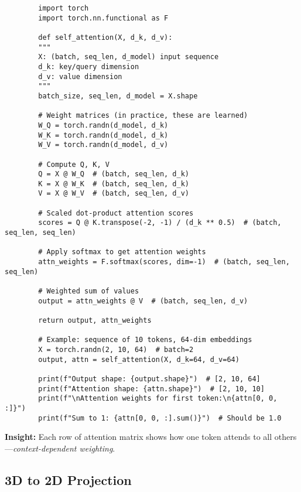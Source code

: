 \begin{codebox}
	\begin{lstlisting}
		import torch
		import torch.nn.functional as F
		
		def self_attention(X, d_k, d_v):
		"""
		X: (batch, seq_len, d_model) input sequence
		d_k: key/query dimension
		d_v: value dimension
		"""
		batch_size, seq_len, d_model = X.shape
		
		# Weight matrices (in practice, these are learned)
		W_Q = torch.randn(d_model, d_k)
		W_K = torch.randn(d_model, d_k)
		W_V = torch.randn(d_model, d_v)
		
		# Compute Q, K, V
		Q = X @ W_Q  # (batch, seq_len, d_k)
		K = X @ W_K  # (batch, seq_len, d_k)
		V = X @ W_V  # (batch, seq_len, d_v)
		
		# Scaled dot-product attention scores
		scores = Q @ K.transpose(-2, -1) / (d_k ** 0.5)  # (batch, seq_len, seq_len)
		
		# Apply softmax to get attention weights
		attn_weights = F.softmax(scores, dim=-1)  # (batch, seq_len, seq_len)
		
		# Weighted sum of values
		output = attn_weights @ V  # (batch, seq_len, d_v)
		
		return output, attn_weights
		
		# Example: sequence of 10 tokens, 64-dim embeddings
		X = torch.randn(2, 10, 64)  # batch=2
		output, attn = self_attention(X, d_k=64, d_v=64)
		
		print(f"Output shape: {output.shape}")  # [2, 10, 64]
		print(f"Attention shape: {attn.shape}")  # [2, 10, 10]
		print(f"\nAttention weights for first token:\n{attn[0, 0, :]}")
		print(f"Sum to 1: {attn[0, 0, :].sum()}")  # Should be 1.0
	\end{lstlisting}
	
	\textbf{Insight:} Each row of attention matrix shows how one token attends to all others---\textit{context-dependent weighting}.
\end{codebox}

\subsection{3D to 2D Projection}

